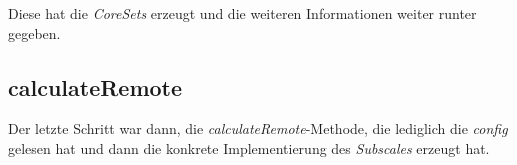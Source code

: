 

Diese hat die \emph{CoreSets} erzeugt und die weiteren Informationen weiter runter gegeben.

\subsection{calculateRemote}
Der letzte Schritt war dann, die \emph{calculateRemote}-Methode, die lediglich die \emph{config}
gelesen hat und dann die konkrete Implementierung des \emph{Subscales} erzeugt hat. 

